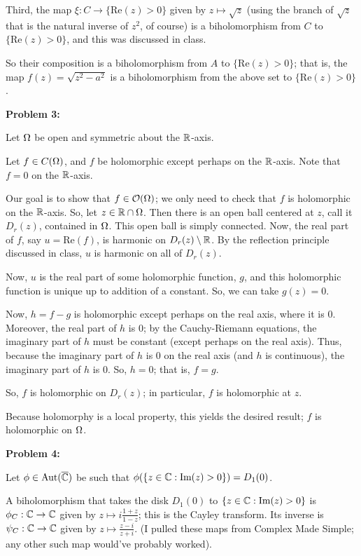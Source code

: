 \documentclass[a4paper,12pt]{article}
\begin{document}
Third, the map $\xi: C \to \{\text{Re}(z) >0\}$ given by $z \mapsto \sqrt{z}$ (using the branch of $\sqrt{z}$ that is the natural inverse of $z^2$, of course) is a biholomorphism from $C$ to $\{\text{Re}(z) >0\}$, and this was discussed in class.

So their composition is a biholomorphism from $A$ to $\{\text{Re}(z) >0\}$; that is, the map $f(z) = \sqrt{z^2-a^2}$ is a biholomorphism from the above set to $\{\text{Re}(z) >0\}$.

\shunt

{\bf Problem 3:}

Let $\Omega$ be open and symmetric about the $\mathbb{R}$-axis.

Let $f \in C(\Omega)$, and $f$ be holomorphic except perhaps on the $\mathbb{R}$-axis. Note that $f=0$ on the $\mathbb{R}$-axis.

Our goal is to show that $f \in \mathcal{O}(\Omega)$; we only need to check that $f$ is holomorphic on the $\mathbb{R}$-axis. So, let $z \in \mathbb{R} \cap \Omega$. Then there is an open ball centered at $z$, call it $D_r(z)$, contained in $\Omega$. This open ball is simply connected. Now, the real part of $f$, say $u = \text{Re}(f)$, is harmonic on $D_r(z) \setminus \mathbb{R}$. By the reflection principle discussed in class, $u$ is harmonic on all of $D_r(z)$.

Now, $u$ is the real part of some holomorphic function, $g$, and this holomorphic function is unique up to addition of a constant. So, we can take $g(z) = 0$. %

Now, $h=f-g$ is holomorphic except perhaps on the real axis, where it is $0$. Moreover, the real part of $h$ is $0$; by the Cauchy-Riemann equations, the imaginary part of $h$ must be constant (except perhaps on the real axis). Thus, because the imaginary part of $h$ is $0$ on the real axis (and $h$ is continuous), the imaginary part of $h$ is $0$. So, $h=0$; that is, $f=g$.

So, $f$ is holomorphic on $D_r(z)$; in particular, $f$ is holomorphic at $z$.

Because holomorphy is a local property, this yields the desired result; $f$ is holomorphic on $\Omega$. 

\shunt

{\bf Problem 4:}

Let $\phi \in \text{Aut}(\overline{\mathbb{C}})$ be such that $\phi(\{z\in \mathbb{C}:\text{Im}(z)>0\}) = D_1(0)$. %

A biholomorphism that takes the disk $D_1(0)$ to $\{z\in \mathbb{C}:\text{Im}(z)>0\}$ is $\phi_C: \mathbb{C} \to \mathbb{C}$ given by $z \mapsto i\frac{1+z}{1-z}$; this is the Cayley transform. Its inverse is $\psi_C: \mathbb{C} \to \mathbb{C}$ given by $z \mapsto \frac{z-i}{z+i}$. (I pulled these maps from Complex Made Simple; any other such map would've probably worked).
\end{document}
